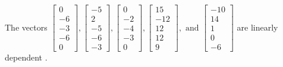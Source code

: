 \begin{exercise}
\begin{exerciseStatement}
  \end{exerciseStatement}
  \begin{exerciseAnswer}
   The vectors \(\left[\begin{array}{r}
0 \\
-6 \\
-3 \\
-6 \\
0
\end{array}\right] , \left[\begin{array}{r}
-5 \\
2 \\
-5 \\
-6 \\
-3
\end{array}\right] , \left[\begin{array}{r}
0 \\
-2 \\
-4 \\
-3 \\
0
\end{array}\right] , \left[\begin{array}{r}
15 \\
-12 \\
12 \\
12 \\
9
\end{array}\right] , \text{ and } \left[\begin{array}{r}
-10 \\
14 \\
1 \\
0 \\
-6
\end{array}\right]\) are 
  	 linearly dependent  .
  


  \end{exerciseAnswer}
\end{exercise}